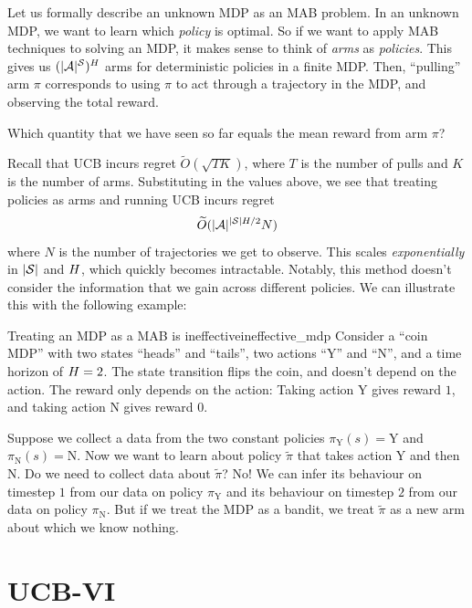 \documentclass[\main/main]{subfiles}
\begin{document}
Let us formally describe an unknown MDP as an MAB problem.
In an unknown MDP, we want to learn which \emph{policy} is optimal. So if we want to apply MAB techniques to solving an MDP, it makes sense to think of \emph{arms} as \emph{policies}.
This gives us $(|\A|^{\S})^\hor$ arms for deterministic policies in a finite MDP.
Then, ``pulling'' arm $\pi$ corresponds to using $\pi$ to act through a trajectory in the MDP, and observing the total reward.

\begin{exercise}
    Which quantity that we have seen so far equals the mean reward from arm $\pi$?
\end{exercise}

Recall that UCB incurs regret $\tilde{O}(\sqrt{TK})$, where $T$ is the number of pulls and $K$ is the number of arms.
Substituting in the values above, we see that treating policies as arms and running UCB incurs regret
\[
    \tilde{O}(|\A|^{|\S|\hor/2} N)
\]
where $N$ is the number of trajectories we get to observe.
This scales \emph{exponentially} in $|\S|$ and $\hor$, which quickly becomes intractable.
Notably, this method doesn't consider the information that we gain across different policies. We can illustrate this with the following example:

\begin{example}{Treating an MDP as a MAB is ineffective}{ineffective_mdp}
    Consider a ``coin MDP'' with two states ``heads'' and ``tails'', two actions ``Y'' and ``N'', and a time horizon of $\hor=2$.
    The state transition flips the coin, and doesn't depend on the action.
    The reward only depends on the action: Taking action Y gives reward $1$, and taking action N gives reward $0$.

    Suppose we collect a data from the two constant policies $\pi_{\text{Y}}(s) = \text{Y}$ and $\pi_{\text{N}}(s) = \text{N}$.
    Now we want to learn about policy $\tilde{\pi}$ that takes action Y and then N.
    Do we need to collect data about $\tilde{\pi}$?
    No! We can infer its behaviour on timestep $1$ from our data on policy $\pi_{\text{Y}}$ and its behaviour on timestep $2$ from our data on policy $\pi_{\text{N}}$.
    But if we treat the MDP as a bandit, we treat $\tilde{\pi}$ as a new arm about which we know nothing.
\end{example}

\section{UCB-VI}
\end{document}
